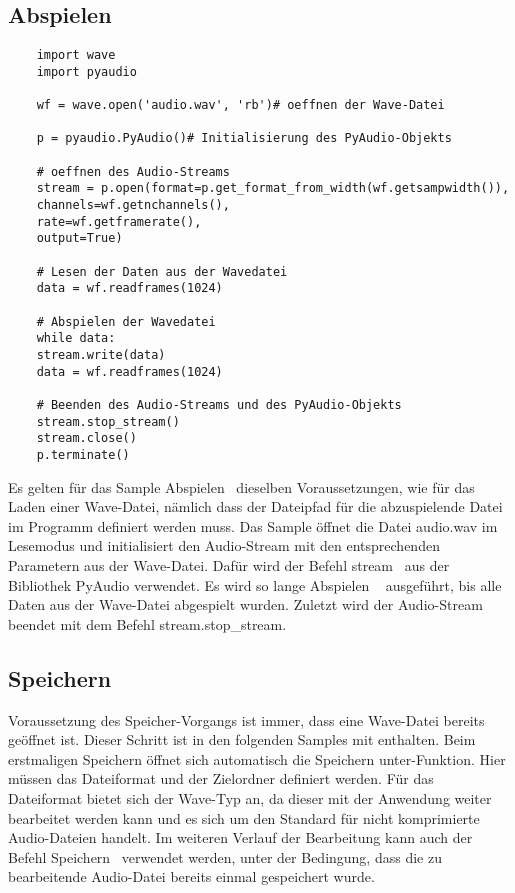 \subsection{Abspielen}

\begin{verbatim}
    import wave
    import pyaudio
    
    wf = wave.open('audio.wav', 'rb')# oeffnen der Wave-Datei
    
    p = pyaudio.PyAudio()# Initialisierung des PyAudio-Objekts
    
    # oeffnen des Audio-Streams
    stream = p.open(format=p.get_format_from_width(wf.getsampwidth()),
    channels=wf.getnchannels(),
    rate=wf.getframerate(),
    output=True)
    
    # Lesen der Daten aus der Wavedatei
    data = wf.readframes(1024)
    
    # Abspielen der Wavedatei
    while data:
    stream.write(data)
    data = wf.readframes(1024)
    
    # Beenden des Audio-Streams und des PyAudio-Objekts
    stream.stop_stream()
    stream.close()
    p.terminate()  
\end{verbatim}

Es gelten für das Sample \glqq Abspielen\grqq~ dieselben Voraussetzungen, wie für das Laden einer Wave-Datei, nämlich dass der Dateipfad für die abzuspielende Datei im Programm definiert werden muss.
Das Sample öffnet die Datei audio.wav im Lesemodus und initialisiert den Audio-Stream mit den entsprechenden Parametern aus der Wave-Datei. Dafür wird der Befehl \glqq stream\grqq~ aus der Bibliothek PyAudio verwendet. Es wird so lange \glqq Abspielen \grqq~ ausgeführt, bis alle Daten aus der Wave-Datei abgespielt wurden. Zuletzt wird der Audio-Stream beendet mit dem Befehl \glqq stream.stop\_stream\grqq.

\subsection{Speichern}

Voraussetzung des \glqq Speicher\grqq-Vorgangs ist immer, dass eine Wave-Datei bereits geöffnet ist.
Dieser Schritt ist in den folgenden Samples mit enthalten. 
Beim erstmaligen Speichern öffnet sich automatisch die \glqq Speichern unter\grqq-Funktion. 
Hier müssen das Dateiformat und der Zielordner definiert werden. 
Für das Dateiformat bietet sich der Wave-Typ an, da dieser mit der Anwendung weiter bearbeitet werden kann und es sich um den Standard für nicht komprimierte Audio-Dateien handelt. Im weiteren Verlauf der Bearbeitung kann auch der Befehl \glqq Speichern\grqq~ verwendet werden, unter der Bedingung, dass die zu bearbeitende Audio-Datei bereits einmal gespeichert wurde.

